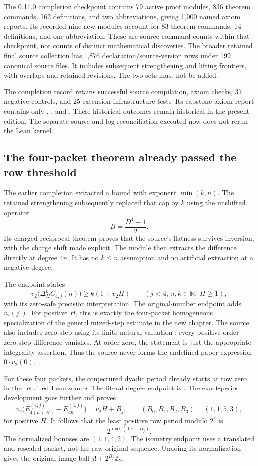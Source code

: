 The 0.11.0 completion checkpoint contains 79 active proof modules, 836 theorem commands, 162 definitions, and two abbreviations, giving 1,000 named axiom reports. Its recorded nine new modules account for 83 theorem commands, 14 definitions, and one abbreviation. These are source-command counts within that checkpoint, not counts of distinct mathematical discoveries. The broader retained final source collection has 1,876 declaration/source-version rows under 199 canonical source files. It includes subsequent strengthening and lifting frontiers, with overlaps and retained revisions. The two sets must not be added.

The completion record retains successful source compilation, axiom checks, 37 negative controls, and 25 extension infrastructure tests. Its capstone axiom report contains only , , and . These historical outcomes remain historical in the present edition. The separate source and log reconciliation executed now does not rerun the Lean kernel.

\subsection{The four-packet theorem already passed the row threshold}
The earlier completion extracted a bound with exponent $\min(k,n)$. The retained strengthening subsequently replaced that cap by $k$ using the unshifted operator
\[
 B=\frac{D^4-1}{2}.
\]
Its charged reciprocal theorem proves that the source's flatness survives inversion, with the charge shift made explicit. The module  then extracts the difference directly at degree $4n$. It has no $k\le n$ assumption and no artificial extraction at a negative degree.

The endpoint  states
\[
 v_2\bigl(\Delta_H^k C_{4,j}(n)\bigr)\ge k(1+v_2H)
 \qquad(j<4,\ n,k\in\mathbb N,\ H\ge1),
\]
with its zero-safe precision interpretation. The original-number endpoint adds $v_2(j!)$. For positive $H$, this is exactly the four-packet homogeneous specialization of the general mixed-step estimate in the new chapter. The source also includes zero step using its finite natural valuation : every positive-order zero-step difference vanishes. At order zero, the statement is just the appropriate integrality assertion. Thus the source never forms the undefined paper expression $0\cdot v_2(0)$.

For these four packets, the conjectured dyadic period already starts at row zero in the retained Lean source. The literal degree endpoint is . The exact-period development goes further and proves
\[
 v_2\bigl(E_{4(n+H)}^{(4,j)}-E_{4n}^{(4,j)}\bigr)
   =v_2H+B_j,\qquad (B_0,B_1,B_2,B_3)=(1,1,5,3),
\]
for positive $H$. It follows that the least positive row period modulo $2^r$ is
\[
 2^{\max(0,r-B_j)}.
\]
The normalized bonuses are $(1,1,4,2)$. The isometry endpoint uses a translated and rescaled packet, not the raw original sequence. Undoing its normalization gives the original image ball $j!+2^{B_j}\mathbb Z_2$.

